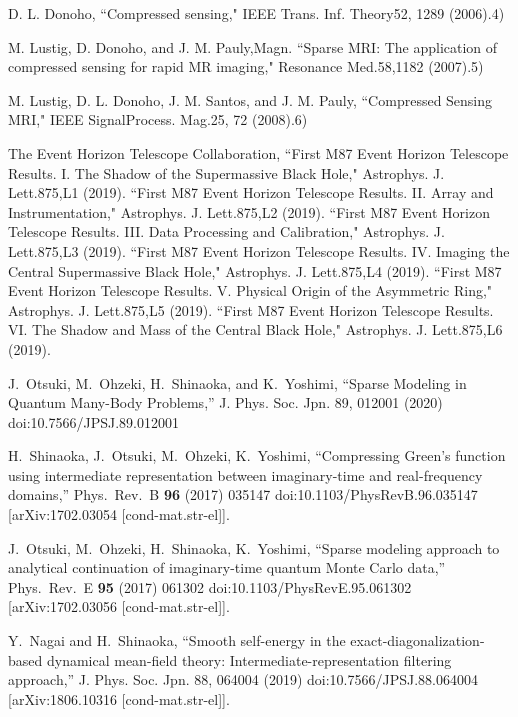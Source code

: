 \documentclass[a4paper,11pt]{article}
\begin{document}
\begin{thebibliography}{99}
  D. L. Donoho,
  ``Compressed sensing,"
  IEEE Trans. Inf. Theory52, 1289 (2006).4)  
  
  M. Lustig, D. Donoho, and J. M. Pauly,Magn. 
  ``Sparse MRI: The application of compressed sensing for rapid MR imaging,"
  Resonance Med.58,1182 (2007).5)  
  
  M. Lustig, D. L. Donoho, J. M. Santos, and J. M. Pauly,
  ``Compressed Sensing MRI,"
  IEEE SignalProcess. Mag.25, 72 (2008).6)
  
  
    
  The Event Horizon Telescope Collaboration,
  ``First M87 Event Horizon Telescope Results. I. The Shadow of the Supermassive Black Hole,"  
  Astrophys. J. Lett.875,L1 (2019).
  ``First M87 Event Horizon Telescope Results. II. Array and Instrumentation,"
    Astrophys. J. Lett.875,L2 (2019).
    ``First M87 Event Horizon Telescope Results. III. Data Processing and Calibration,"
    Astrophys. J. Lett.875,L3 (2019).    
    ``First M87 Event Horizon Telescope Results. IV. Imaging the Central Supermassive Black Hole,"
        Astrophys. J. Lett.875,L4 (2019).
    ``First M87 Event Horizon Telescope Results. V. Physical Origin of the Asymmetric Ring,"
        Astrophys. J. Lett.875,L5 (2019).
``First M87 Event Horizon Telescope Results. VI. The Shadow and Mass of the Central Black Hole,"
    Astrophys. J. Lett.875,L6 (2019).



J.~Otsuki, M.~Ohzeki,  H.~Shinaoka, and K.~Yoshimi,
  ``Sparse Modeling in Quantum Many-Body Problems,''
J. Phys. Soc. Jpn. 89, 012001 (2020) 
doi:10.7566/JPSJ.89.012001

 H.~Shinaoka, J.~Otsuki, M.~Ohzeki, K.~Yoshimi,
  ``Compressing Green's function using intermediate representation between imaginary-time and real-frequency domains,''
  Phys.\ Rev.\ B {\bf 96} (2017)  035147
  doi:10.1103/PhysRevB.96.035147
  [arXiv:1702.03054 [cond-mat.str-el]].

 J.~Otsuki, M.~Ohzeki, H.~Shinaoka, K.~Yoshimi,
  ``Sparse modeling approach to analytical continuation of imaginary-time quantum Monte Carlo data,''
  Phys.\ Rev.\ E {\bf 95} (2017)  061302
  doi:10.1103/PhysRevE.95.061302
  [arXiv:1702.03056 [cond-mat.str-el]].

Y.~Nagai and H.~Shinaoka,
  ``Smooth self-energy in the exact-diagonalization-based dynamical mean-field theory: Intermediate-representation filtering approach,''
 	J. Phys. Soc. Jpn. 88, 064004 (2019)
 	doi:10.7566/JPSJ.88.064004
 [arXiv:1806.10316 [cond-mat.str-el]].



\end{thebibliography}
\end{document}
